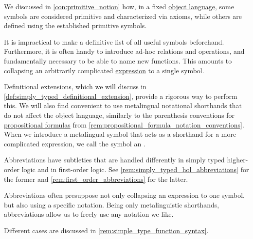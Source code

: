 \begin{concept}\label{con:metalingual_abbreviation}\mimprovised
  We discussed in \cref{con:primitive_notion} how, in a fixed \hyperref[con:metalogic]{object language}, some symbols are considered primitive and characterized via axioms, while others are defined using the established primitive symbols.

  It is impractical to make a definitive list of all useful symbols beforehand. Furthermore, it is often handy to introduce ad-hoc relations and operations, and fundamentally necessary to be able to name new functions. This amounts to collapsing an arbitrarily complicated \hyperref[con:expression]{expression} to a single symbol.

  Definitional extensions, which we will discuss in \cref{def:simply_typed_definitional_extension}, provide a rigorous way to perform this. We will also find convenient to use metalingual notational shorthands that do not affect the object language, similarly to the parenthesis conventions for \hyperref[def:propositional_syntax/formula]{propositional formulas} from \cref{rem:propositional_formula_notation_conventions}. When we introduce a metalingual symbol that acts as a shorthand for a more complicated expression, we call the symbol an .

  Abbreviations have subtleties that are handled differently in simply typed higher-order logic and in first-order logic. See \cref{rem:simply_typed_hol_abbreviations} for the former and \cref{rem:first_order_abbreviations} for the latter.
\end{concept}
\begin{comments}
  \item Abbreviations often presuppose not only collapsing an expression to one symbol, but also using a specific notation. Being only metalinguistic shorthands, abbreviations allow us to freely use any notation we like.

  Different cases are discussed in \cref{rem:simple_type_function_syntax}.
\end{comments}

